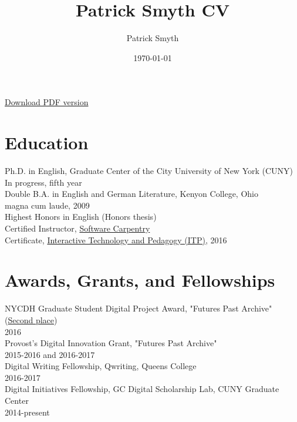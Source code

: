 \documentclass[11pt]{article}
\author{Patrick Smyth}
\date{\today}
\title{Patrick Smyth CV}
\begin{document}
\maketitle
\href{https://github.com/smythp/cv/raw/master/cv.pdf}{Download PDF version}\\
\section*{Education}
\label{sec:orgheadline1}

Ph.D. in English, Graduate Center of the City University of New York (CUNY)\\
        In progress, fifth year\\

Double B.A. in English and German Literature, Kenyon College, Ohio\\
        magna cum laude, 2009\\
        Highest Honors in English (Honors thesis)\\

Certified Instructor, \href{https://software-carpentry.org/about/}{Software Carpentry}\\

Certificate, \href{https://www.gc.cuny.edu/Page-Elements/Academics-Research-Centers-Initiatives/Certificate-Programs/Interactive-Technology-and-Pedagogy}{Interactive Technology and Pedagogy (ITP)}, 2016\\

\section*{Awards, Grants, and Fellowships}
\label{sec:orgheadline2}
NYCDH Graduate Student Digital Project Award, "Futures Past Archive" (\href{http://nycdh.org/nycdh-graduate-student-digital-project-awards-2016/}{Second place})\\
2016\\

Provost's Digital Innovation Grant, "Futures Past Archive"\\
2015-2016 and 2016-2017\\

Digital Writing Fellowship, Qwriting, Queens College\\
2016-2017\\

Digital Initiatives Fellowship, GC Digital Scholarship Lab, CUNY Graduate Center\\
2014-present\\
\end{document}
